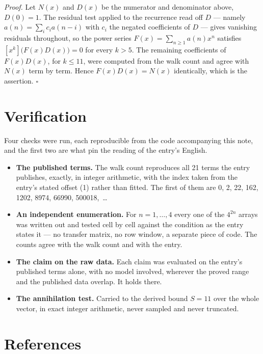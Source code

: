 \documentclass[11pt]{article}
\theoremstyle{definition}
\begin{document}
{\itshape Proof.} Let $N(x)$ and $D(x)$ be the numerator and denominator above, $D(0)=1$. The residual test applied to the recurrence read off $D$ --- namely $a(n) = \sum_i c_i a(n-i)$ with $c_i$ the negated coefficients of $D$ --- gives vanishing residuals throughout, so the power series $F(x)=\sum_{n\ge 1}a(n)x^n$ satisfies $[x^k]\bigl(F(x)D(x)\bigr) = 0$ for every $k > 5$. The remaining coefficients of $F(x)D(x)$, for $k \le 11$, were computed from the walk count and agree with $N(x)$ term by term. Hence $F(x)D(x) = N(x)$ identically, which is the assertion. $\square$

\section{Verification}

Four checks were run, each reproducible from the code accompanying this note, and the first two are what pin the reading of the entry's English.

\begin{itemize}

\item {\bfseries The published terms.} The walk count reproduces all 21 terms the entry publishes, exactly, in integer arithmetic, with the index taken from the entry's stated offset (1) rather than fitted. The first of them are 0, 2, 22, 162, 1202, 8974, 66990, 500018,~\dots

\item {\bfseries An independent enumeration.} For $n = 1,\dots,4$ every one of the $4^{2n}$ arrays was written out and tested cell by cell against the condition as the entry states it --- no transfer matrix, no row window, a separate piece of code. The counts agree with the walk count and with the entry.

\item {\bfseries The claim on the raw data.} Each claim was evaluated on the entry's published terms alone, with no model involved, wherever the proved range and the published data overlap. It holds there.

\item {\bfseries The annihilation test.} Carried to the derived bound $S = 11$ over the whole vector, in exact integer arithmetic, never sampled and never truncated.

\end{itemize}

\section{References}
\end{document}
